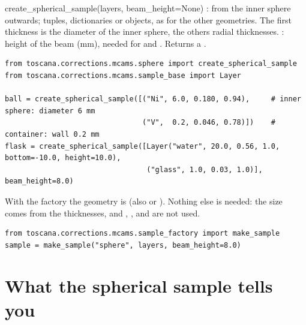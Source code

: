 \begin{fnbox}{create\_spherical\_sample(layers, beam\_height=None)}
: from the inner sphere outwards; tuples, dictionaries or  objects, as for the other geometries. The first
thickness is the diameter of the inner sphere, the others radial thicknesses. : height of the beam (mm), needed for
 and . Returns a .
\end{fnbox}

\begin{lstlisting}
from toscana.corrections.mcams.sphere import create_spherical_sample
from toscana.corrections.mcams.sample_base import Layer

ball = create_spherical_sample([("Ni", 6.0, 0.180, 0.94),     # inner sphere: diameter 6 mm
                                ("V",  0.2, 0.046, 0.78)])    # container: wall 0.2 mm
flask = create_spherical_sample([Layer("water", 20.0, 0.56, 1.0, bottom=-10.0, height=10.0),
                                 ("glass", 1.0, 0.03, 1.0)], beam_height=8.0)
\end{lstlisting}
With the factory the geometry is  (also  or ). Nothing else is needed: the size comes from
the thicknesses, and , ,  and  are not used.
\begin{lstlisting}
from toscana.corrections.mcams.sample_factory import make_sample
sample = make_sample("sphere", layers, beam_height=8.0)
\end{lstlisting}

\section{What the spherical sample tells you}

